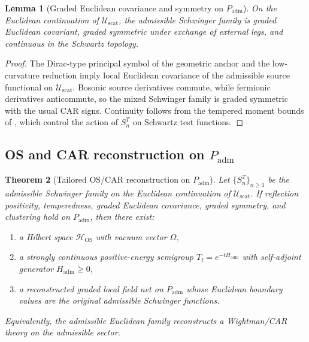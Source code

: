 \documentclass[11pt,a4paper]{article}
\newtheorem{theorem}{Theorem}[section]
\newtheorem{lemma}[theorem]{Lemma}
\theoremstyle{definition}
\theoremstyle{remark}
\newcommand{\Padm}{P_{\mathrm{adm}}}
\begin{document}
\begin{lemma}[Graded Euclidean covariance and symmetry on \texorpdfstring{$\Padm$}{Padm}]
\label{lem:graded-euclidean-covariance-padm}
On the Euclidean continuation of $\mathcal U_{\mathrm{scat}}$, the admissible Schwinger family is
graded Euclidean covariant, graded symmetric under exchange of external legs, and continuous in the
Schwartz topology.
\end{lemma}

\begin{proof}
The Dirac-type principal symbol of the geometric anchor and the low-curvature reduction imply local
Euclidean covariance of the admissible source functional on $\mathcal U_{\mathrm{scat}}$. Bosonic
source derivatives commute, while fermionic derivatives anticommute, so the mixed Schwinger family
is graded symmetric with the usual CAR signs. Continuity follows from the tempered moment bounds of
, which control the action of $S_n^T$ on Schwartz test
functions.
\end{proof}

\subsection{OS and CAR reconstruction on \texorpdfstring{$\Padm$}{Padm}}

\begin{theorem}[Tailored OS/CAR reconstruction on \texorpdfstring{$\Padm$}{Padm}]
\label{thm:tailored-os-car-reconstruction}
Let $\{S_n^T\}_{n\ge 1}$ be the admissible Schwinger family on the Euclidean continuation of
$\mathcal U_{\mathrm{scat}}$. If reflection positivity, temperedness, graded Euclidean covariance,
graded symmetry, and clustering hold on $\Padm$, then there exist:
\begin{enumerate}[label=(\roman*), leftmargin=1.8em, topsep=3pt, itemsep=2pt]
    \item a Hilbert space $\mathcal H_{\mathrm{OS}}$ with vacuum vector $\Omega$,
    \item a strongly continuous positive-energy semigroup $T_t=e^{-tH_{\mathrm{adm}}}$ with
    self-adjoint generator $H_{\mathrm{adm}}\ge 0$,
    \item a reconstructed graded local field net on $\Padm$ whose Euclidean boundary values are the
    original admissible Schwinger functions.
\end{enumerate}
Equivalently, the admissible Euclidean family reconstructs a Wightman/CAR theory on the admissible
sector.
\end{theorem}
\end{document}
